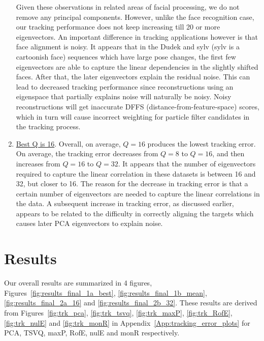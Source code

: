 \begin{enumerate}
Given these observations in related areas of facial processing, we do not remove any principal components.  However, unlike the face recognition case, our tracking performance does not keep increasing till 20 or more eigenvectors.  An important difference in tracking applications however is that face alignment is noisy.  It appears that in the Dudek and sylv (sylv is a cartoonish face) sequences which have large pose changes, the first few eigenvectors are able to capture the linear dependencies in the slightly shifted faces.  After that, the later eigenvectors explain the residual noise.  This can lead to decreased tracking performance since reconstructions using an eigenspace that partially explains noise will naturally be noisy.  Noisy reconstructions will get inaccurate DFFS (distance-from-feature-space) scores, which in turn will cause incorrect weighting for particle filter candidates in the tracking process.
\item \underline{Best Q is 16}.  Overall, on average, $Q=16$ produces the lowest tracking error.  On average, the tracking error decreases from $Q=8$ to $Q=16$, and then increases from $Q=16$ to $Q=32$.  It appears that the number of eigenvectors required to capture the linear correlation in these datasets is between 16 and 32, but closer to 16.   
The reason for the decrease in tracking error is that a certain number of eigenvectors are needed to capture the linear correlations in the data.  A subsequent increase in tracking error, as discussed earlier, appears to be related to the difficulty in correctly aligning the targets which causes later PCA eigenvectors to explain noise.
\end{enumerate}

\section{Results}
Our overall results are summarized in 4 figures, Figures~\ref{fig:results_final_1a_best}, \ref{fig:results_final_1b_mean}, \ref{fig:results_final_2a_16} and \ref{fig:results_final_2b_32}.  These results are derived from Figures~\ref{fig:trk_pca}, \ref{fig:trk_tsvq}, \ref{fig:trk_maxP}, \ref{fig:trk_RofE}, \ref{fig:trk_nulE} and \ref{fig:trk_monR} in Appendix~\ref{App:tracking_error_plots} for PCA, TSVQ, maxP, RofE, nulE and monR respectively.

